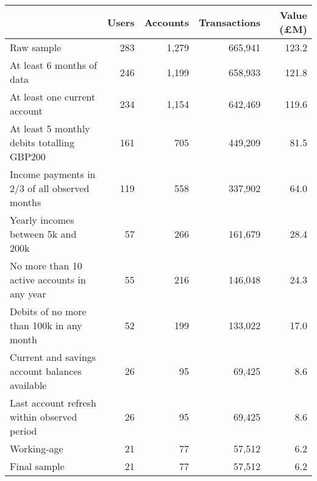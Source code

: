 \begin{tabular}{lrrrr}
\toprule
                                               & Users & Accounts & Transactions & Value (\pounds M) \\
\midrule
                                    Raw sample &   283 &    1,279 &      665,941 &             123.2 \\
                     At least 6 months of data &   246 &    1,199 &      658,933 &             121.8 \\
                  At least one current account &   234 &    1,154 &      642,469 &             119.6 \\
    At least 5 monthly debits totalling GBP200 &   161 &      705 &      449,209 &              81.5 \\
 Income payments in 2/3 of all observed months &   119 &      558 &      337,902 &              64.0 \\
            Yearly incomes between 5k and 200k &    57 &      266 &      161,679 &              28.4 \\
   No more than 10 active accounts in any year &    55 &      216 &      146,048 &              24.3 \\
      Debits of no more than 100k in any month &    52 &      199 &      133,022 &              17.0 \\
Current and savings account balances available &    26 &       95 &       69,425 &               8.6 \\
   Last account refresh within observed period &    26 &       95 &       69,425 &               8.6 \\
                                   Working-age &    21 &       77 &       57,512 &               6.2 \\
                                  Final sample &    21 &       77 &       57,512 &               6.2 \\
\bottomrule
\end{tabular}

